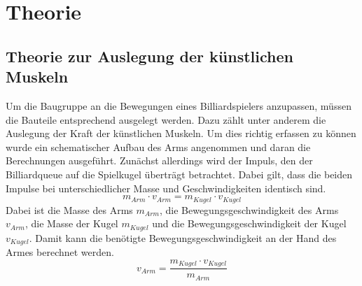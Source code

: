 \chapter{Theorie}
\section{Theorie zur Auslegung der künstlichen Muskeln}
Um die Baugruppe an die Bewegungen eines Billiardspielers anzupassen, müssen die Bauteile entsprechend ausgelegt werden. 
Dazu zählt unter anderem die Auslegung der Kraft der künstlichen Muskeln. 
Um dies richtig erfassen zu können wurde ein schematischer Aufbau des Arms angenommen und daran die Berechnungen ausgeführt. 
Zunächst allerdings wird der Impuls, den der Billiardqueue auf die Spielkugel überträgt betrachtet. 
Dabei gilt, dass die beiden Impulse bei unterschiedlicher Masse und Geschwindigkeiten identisch sind. 
\begin{equation}
	m_{Arm} \cdot v_{Arm} = m_{Kugel} \cdot v_{Kugel}
	\label{eq:ImpulsKugel}
\end{equation}
Dabei ist die Masse des Arms \(m_{Arm}\), die Bewegungsgeschwindigkeit des Arms \(v_{Arm}\), die Masse der Kugel \(m_{Kugel}\) und die Bewegungsgeschwindigkeit der Kugel \(v_{Kugel}\).
Damit kann die benötigte Bewegungsgeschwindigkeit an der Hand des Armes berechnet werden.
\begin{equation}
	v_{Arm} = \frac{m_{Kugel} \cdot v_{Kugel}}{m_{Arm}}
	\label{eq:SollgeschwindikeitArm}
\end{equation}

